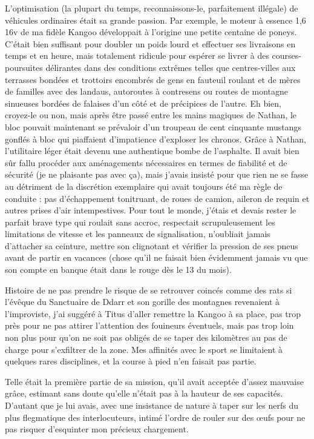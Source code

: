 L’optimisation (la plupart du temps, recon\-nais\-sons-le, parfaitement illégale) de véhicules ordinaires était sa grande passion. Par exemple, le moteur à essence 1,6 16v de ma fidèle Kangoo développait à l’origine une petite centaine de poneys. C’était bien suffisant pour doubler un poids lourd et effectuer ses livraisons en temps et en heure, mais totalement ridicule pour espérer se livrer à des courses-poursuites délirantes dans des conditions extrêmes telles que centres-villes aux terrasses bondées et trottoirs encombrés de gens en fauteuil roulant et de mères de familles avec des landaus, autoroutes à contresens ou routes de montagne sinueuses bordées de falaises d’un côté et de précipices de l’autre. Eh bien, croyez-le ou non, mais après être passé entre les mains magiques de Nathan, le bloc pouvait maintenant se prévaloir d’un troupeau de cent cinquante mustangs gonflés à bloc qui piaffaient d’impatience d’exploser les chronos. Grâce à Nathan, l’utilitaire léger était devenu une authentique bombe de l’asphalte. Il avait bien sûr fallu procéder aux aménagements nécessaires en termes de fiabilité et de sécurité (je ne plaisante pas avec ça), mais j’avais insisté pour que rien ne se fasse au détriment de la discrétion exemplaire qui avait toujours été ma règle de conduite : pas d’échappement tonitruant, de roues de camion, aileron de requin et autres prises d’air intempestives. Pour tout le monde, j’étais et devais rester le parfait brave type qui roulait sans accroc, respectait scrupuleusement les limitations de vitesse et les panneaux de signalisation, n’oubliait jamais d’attacher sa ceinture, mettre son clignotant et vérifier la pression de ses pneus avant de partir en vacances (chose qu’il ne faisait bien évidemment jamais vu que son compte en banque était dans le rouge dès le 13 du mois).

Histoire de ne pas prendre le risque de se retrouver coincés comme des rats si l’évêque du Sanctuaire de Ddarr et son gorille des montagnes revenaient à l’improviste, j’ai suggéré à Titus d’aller remettre la Kangoo à sa place, pas trop près pour ne pas attirer l’attention des fouineurs éventuels, mais pas trop loin non plus pour qu’on ne soit pas obligés de se taper des kilomètres au pas de charge pour s’exfiltrer de la zone. Mes affinités avec le sport se limitaient à quelques rares disciplines, et la course à pied n’en faisait pas partie.

Telle était la première partie de sa mission, qu’il avait acceptée d’assez mauvaise grâce, estimant sans doute qu’elle n’était pas à la hauteur de ses capacités. D’autant que je lui avais, avec une insistance de nature à taper sur les nerfs du plus flegmatique des interlocuteurs, intimé l’ordre de rouler sur des œufs pour ne pas risquer d’esquinter mon précieux chargement.

